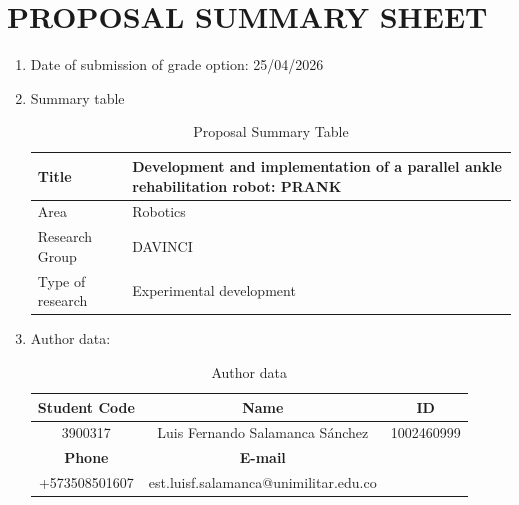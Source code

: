 \section*{PROPOSAL SUMMARY SHEET}
{}

\begin{enumerate}
    \item Date of submission of grade option: 25/04/2026
    \item Summary table
    \begin{table}[h]
        \centering
        \begin{tabular}{|s|m{0.8\textwidth}|}
        \hline
          Title   &  Development and implementation of a parallel ankle rehabilitation robot: PRANK \\
        \hline
          Area   & Robotics  
          \\
        \hline
          Research Group & DAVINCI  
          \\
        \hline
          Type of research & Experimental development
          \\
        \hline
        \end{tabular}
        \caption{Proposal Summary Table}
        \label{tab:summary}
    \end{table}
    \item Author data:
    \begin{table}[h]
        \centering
        \begin{tabular}{|c|c|c|}
        \hline
        \rowcolor{Gray}
            \textbf{Student Code} & \textbf{Name} & \textbf{ID}\\
        \hline
            3900317 & Luis Fernando Salamanca Sánchez & 1002460999\\
        \hline
        \rowcolor{Gray}
            \textbf{Phone} & \textbf{E-mail}  \\
        \cline{1-2}
            +573508501607 & est.luisf.salamanca@unimilitar.edu.co\\
        \cline{1-2}
        \end{tabular}     
        \caption{Author data}
        \label{tab:author_data}
    \end{table}
\end{enumerate}
